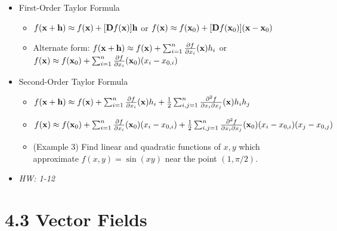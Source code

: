 \documentclass[11pt]{article}
\begin{document}
\begin{itemize}
  \item First-Order Taylor Formula
    \begin{itemize}
      \item
        \(
          f(\mathbf{x} + \mathbf{h})
            \approx
          f(\mathbf{x}) + [\mathbf{D}f(\mathbf{x})]\mathbf{h}
        \)
          or
        \(
          f(\mathbf{x})
            \approx
          f(\mathbf{x}_0) + [\mathbf{D}f(\mathbf{x}_0)](\mathbf{x} - \mathbf{x}_0)
        \)
      \item Alternate form:
        \(
          f(\mathbf{x} + \mathbf{h})
            \approx
          f(\mathbf{x})
            +
          \sum_{i=1}^{n}\frac{\partial f}{\partial x_i}(\mathbf{x})h_i
        \)
          or
        \(
          f(\mathbf{x})
            \approx
          f(\mathbf{x}_0)
            +
          \sum_{i=1}^{n}\frac{\partial f}{\partial x_i}(\mathbf{x}_0)(x_i - x_{0,i})
        \)
    \end{itemize}
  \item Second-Order Taylor Formula
    \begin{itemize}
      \item
        \(
          f(\mathbf{x} + \mathbf{h})
            \approx
          f(\mathbf{x})
            +
          \sum_{i=1}^{n}\frac{\partial f}{\partial x_i}(\mathbf{x})h_i
            +
          \frac{1}{2}
          \sum_{i,j=1}^{n}\frac{\partial^2 f}{\partial x_i\partial x_j}(\mathbf{x})h_ih_j
        \)
      \item
        \(
          f(\mathbf{x})
            \approx
          f(\mathbf{x}_0)
            +
          \sum_{i=1}^{n}\frac{\partial f}{\partial x_i}(\mathbf{x}_0)(x_i-x_{0,i})
            +
          \frac{1}{2}
          \sum_{i,j=1}^{n}\frac{\partial^2 f}{\partial x_i\partial x_j}(\mathbf{x}_0)(x_i-x_{0,i})(x_j-x_{0,j})
        \)
      \item
        (Example 3) Find linear and quadratic functions of \(x,y\) which
        approximate \(f(x,y)=\sin(xy)\) near the point \((1,\pi/2)\).
    \end{itemize}
  \item\textit{
    HW: 1-12
  }
\end{itemize}


\section*{4.3 Vector Fields}
\end{document}
